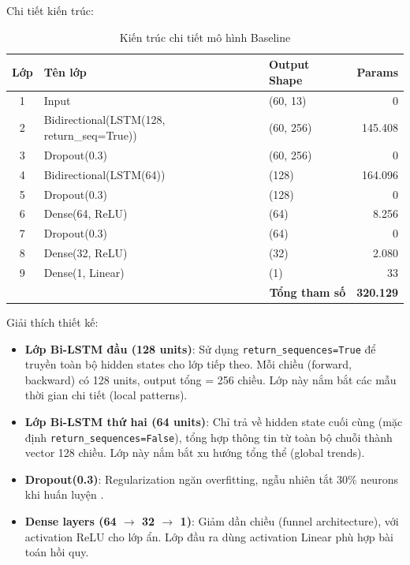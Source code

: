 Chi tiết kiến trúc:

\begin{table}[H]
\centering
\caption{Kiến trúc chi tiết mô hình Baseline}
\label{tab:baseline_architecture}
\small
\begin{tabular}{|c|l|l|r|}
\hline
\textbf{Lớp} & \textbf{Tên lớp} & \textbf{Output Shape} & \textbf{Params} \\
\hline
1 & Input                              & (60, 13)         & 0 \\
2 & Bidirectional(LSTM(128, return\_seq=True)) & (60, 256)  & 145.408 \\
3 & Dropout(0.3)                       & (60, 256)        & 0 \\
4 & Bidirectional(LSTM(64))            & (128)            & 164.096 \\
5 & Dropout(0.3)                       & (128)            & 0 \\
6 & Dense(64, ReLU)                    & (64)             & 8.256 \\
7 & Dropout(0.3)                       & (64)             & 0 \\
8 & Dense(32, ReLU)                    & (32)             & 2.080 \\
9 & Dense(1, Linear)                   & (1)              & 33 \\
\hline
\multicolumn{3}{|r|}{\textbf{Tổng tham số}} & \textbf{320.129} \\
\hline
\end{tabular}
\end{table}

Giải thích thiết kế:
\begin{itemize}
    \item \textbf{Lớp Bi-LSTM đầu (128 units)}: Sử dụng \texttt{return\_sequences=True} để truyền toàn bộ hidden states cho lớp tiếp theo. Mỗi chiều (forward, backward) có 128 units, output tổng = 256 chiều. Lớp này nắm bắt các mẫu thời gian chi tiết (local patterns).
    \item \textbf{Lớp Bi-LSTM thứ hai (64 units)}: Chỉ trả về hidden state cuối cùng (mặc định \texttt{return\_sequences=False}), tổng hợp thông tin từ toàn bộ chuỗi thành vector 128 chiều. Lớp này nắm bắt xu hướng tổng thể (global trends).
    \item \textbf{Dropout(0.3)}: Regularization ngăn overfitting, ngẫu nhiên tắt 30\% neurons khi huấn luyện \cite{srivastava2014dropout}.
    \item \textbf{Dense layers (64 $\to$ 32 $\to$ 1)}: Giảm dần chiều (funnel architecture), với activation ReLU cho lớp ẩn. Lớp đầu ra dùng activation Linear phù hợp bài toán hồi quy.
\end{itemize}

